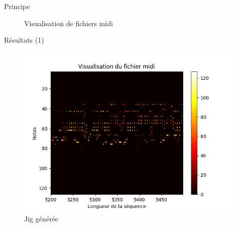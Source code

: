 \documentclass{beamer}
\begin{document}
\begin{frame}{Principe}
\begin{figure}[!tbp]
  \centering
  \hfill
  \caption{Visualisation de fichiers midi}
\end{figure}
\end{frame}

\begin{frame}{Résultats (1)}

\begin{figure}
\begin{center}
\includegraphics[width=0.9\linewidth]{images/jig_generated_38800.png}
\caption{Jig générée}
\end{center}
\end{figure}
\end{frame}
\end{document}
